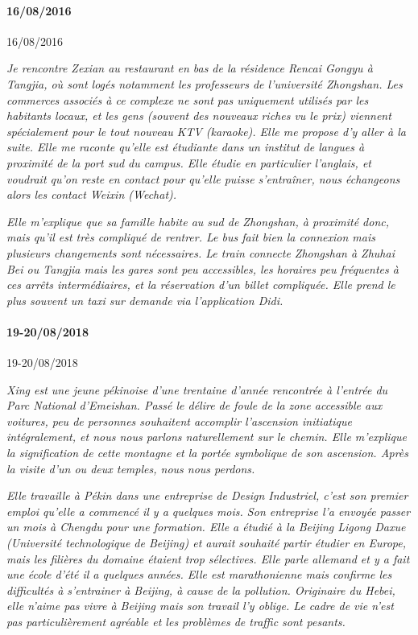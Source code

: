 \paragraph{16/08/2016}{16/08/2016}


\textit{Je rencontre Zexian au restaurant en bas de la résidence Rencai Gongyu à Tangjia, où sont logés notamment les professeurs de l'université Zhongshan. Les commerces associés à ce complexe ne sont pas uniquement utilisés par les habitants locaux, et les gens (souvent des nouveaux riches vu le prix) viennent spécialement pour le tout nouveau KTV (karaoke). Elle me propose d'y aller à la suite. Elle me raconte qu'elle est étudiante dans un institut de langues à proximité de la port sud du campus. Elle étudie en particulier l'anglais, et voudrait qu'on reste en contact pour qu'elle puisse s'entraîner, nous échangeons alors les contact Weixin (Wechat).}

\textit{Elle m'explique que sa famille habite au sud de Zhongshan, à proximité donc, mais qu'il est très compliqué de rentrer. Le bus fait bien la connexion mais plusieurs changements sont nécessaires. Le train connecte Zhongshan à Zhuhai Bei ou Tangjia mais les gares sont peu accessibles, les horaires peu fréquentes à ces arrêts intermédiaires, et la réservation d'un billet compliquée. Elle prend le plus souvent un taxi sur demande via l'application Didi.}



\paragraph{19-20/08/2018}{19-20/08/2018}

\textit{Xing est une jeune pékinoise d'une trentaine d'année rencontrée à l'entrée du Parc National d'Emeishan. Passé le délire de foule de la zone accessible aux voitures, peu de personnes souhaitent accomplir l'ascension initiatique intégralement, et nous nous parlons naturellement sur le chemin. Elle m'explique la signification de cette montagne et la portée symbolique de son ascension. Après la visite d'un ou deux temples, nous nous perdons.}

\textit{Elle travaille à Pékin dans une entreprise de Design Industriel, c'est son premier emploi qu'elle a commencé il y a quelques mois. Son entreprise l'a envoyée passer un mois à Chengdu pour une formation. Elle a étudié à la Beijing Ligong Daxue (Université technologique de Beijing) et aurait souhaité partir étudier en Europe, mais les filières du domaine étaient trop sélectives. Elle parle allemand et y a fait une école d'été il a quelques années. Elle est marathonienne mais confirme les difficultés à s'entrainer à Beijing, à cause de la pollution. Originaire du Hebei, elle n'aime pas vivre à Beijing mais son travail l'y oblige. Le cadre de vie n'est pas particulièrement agréable et les problèmes de traffic sont pesants.}

